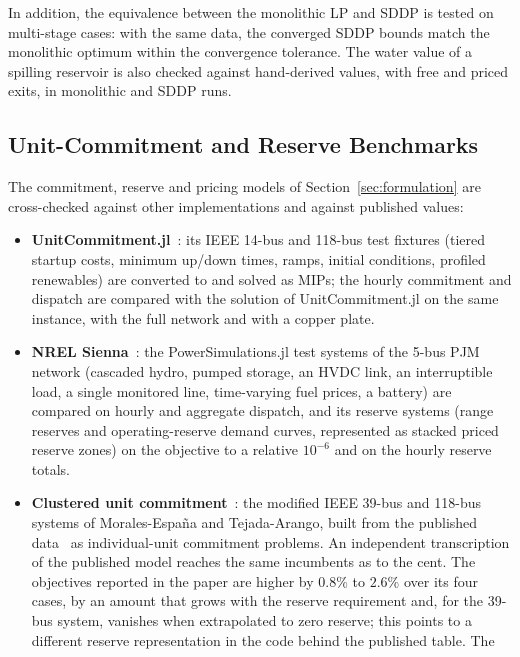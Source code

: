 In addition, the equivalence between the monolithic LP and SDDP is
tested on multi-stage cases: with the same data, the converged SDDP
bounds match the monolithic optimum within the convergence tolerance.
The water value of a spilling reservoir is also checked against
hand-derived values, with free and priced exits, in monolithic and
SDDP runs.

\subsection{Unit-Commitment and Reserve Benchmarks}
\label{sec:uc_bench}

The commitment, reserve and pricing models of
Section~\ref{sec:formulation} are cross-checked against other
implementations and against published values:
\begin{itemize}
  \item \textbf{UnitCommitment.jl}~\cite{xavier2024ucjl}: its IEEE
    14-bus and 118-bus test fixtures (tiered startup costs, minimum
    up/down times, ramps, initial conditions, profiled renewables) are
    converted to \gtopt{} and solved as MIPs; the hourly commitment
    and dispatch are compared with the solution of UnitCommitment.jl
    on the same instance, with the full network and with a copper
    plate.
  \item \textbf{NREL Sienna}~\cite{lara2021powersystems,
    powersimulations}: the PowerSimulations.jl test systems of the
    5-bus PJM network (cascaded hydro, pumped storage, an HVDC link, an
    interruptible load, a single monitored line, time-varying fuel
    prices, a battery) are compared on hourly and aggregate dispatch,
    and its reserve systems (range reserves and operating-reserve
    demand curves, represented as stacked priced reserve zones) on the
    objective to a relative $10^{-6}$ and on the hourly reserve totals.
  \item \textbf{Clustered unit commitment}~\cite{morales2019cuc}: the
    modified IEEE 39-bus and 118-bus systems of Morales-Espa\~na and
    Tejada-Arango, built from the published data~\cite{cucdata} as
    individual-unit commitment problems.  An independent transcription
    of the published model reaches the same incumbents as \gtopt{} to
    the cent.  The objectives reported in the paper are higher by
    $0.8\%$ to $2.6\%$ over its four cases, by an amount that grows
    with the reserve requirement and, for the 39-bus system, vanishes
    when extrapolated to zero reserve; this points to a different
    reserve representation in the code behind the published table.  The

\end{itemize}
